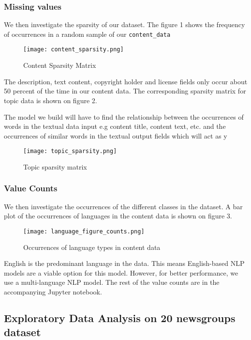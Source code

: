 \documentclass{article}
\begin{document}
\subsubsection{Missing values}

We then investigate the sparsity of our dataset. The figure 1 shows the frequency of occurrences in a random sample of our \texttt{content\_data}

\begin{figure}[htp]
    \centering
    \texttt{[image: content\_sparsity.png]}
    \caption{Content Sparsity Matrix}
    \label{fig:galaxy}
\end{figure}

The description, text content, copyright holder and license  fields only occur about 50 percent of the time in our content data. The corresponding sparsity matrix for topic data is shown on figure 2. 

The model we build will have to find the relationship between the occurrences of words in the textual data input  e.g content title, content text, etc. and the occurrences of similar words in the textual output fields which will act as y

\begin{figure}[htp]
    \centering
    \texttt{[image: topic\_sparsity.png]}
    \caption{Topic sparsity matrix}
    \label{fig:galaxy}
\end{figure} 

\subsubsection{Value Counts} 

We then investigate the occurrences of the different classes in the dataset. A bar plot of the occurrences of languages in the content data is shown on figure 3.

\begin{figure}[htp]
    \centering
    \texttt{[image: language\_figure\_counts.png]}
    \caption{Occurrences of language types in content data}
    \label{fig:galaxy}
\end{figure}  

English is the predominant language in the data. This means English-based NLP models are a viable option for this model. However, for better performance, we use a multi-language NLP model. The rest of the value counts are in the accompanying Jupyter notebook.

\subsection{Exploratory Data Analysis on 20 newsgroups dataset} 
\end{document}
